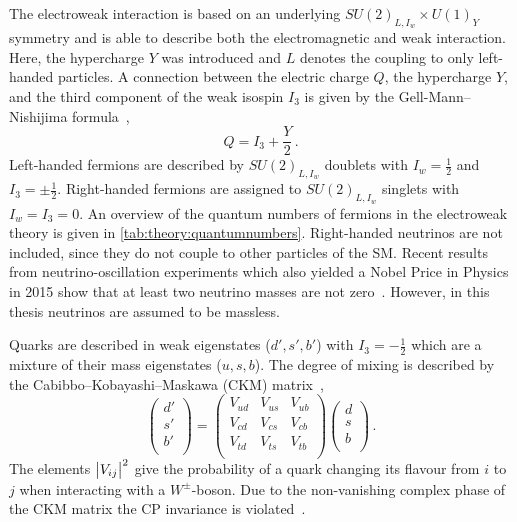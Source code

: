 The electroweak interaction is based on an underlying $SU{(2)}_{L,I_w} \times U{(1)}_Y$ symmetry
and is able to describe both the electromagnetic and weak interaction.
Here, the hypercharge $Y$ was introduced and $L$ denotes the coupling to only left-handed particles.
A connection between the electric charge $Q$, the hypercharge $Y$, and the third component of the weak isospin $I_3$
is given by the Gell-Mann--Nishijima formula~\cite{Nishijima1955,GellMann1956},
\begin{equation}
    Q = I_3 + \frac{Y}{2} \,.
\end{equation}
Left-handed fermions are described by $SU{(2)}_{L,I_w}$ doublets with $I_w = \frac{1}{2}$ and $I_3 = \pm \frac{1}{2}$.
Right-handed fermions are assigned to $SU{(2)}_{L,I_w}$ singlets with $I_w = I_3 = 0$.
An overview of the quantum numbers of fermions in the electroweak theory is given in \cref{tab:theory:quantumnumbers}.
Right-handed neutrinos are not included, since they do not couple to other particles of the SM\@.
Recent results from neutrino-oscillation experiments which also yielded a Nobel Price in Physics in 2015 show that at
least two neutrino masses are not zero~\cite{NeutrinoOsc1,NeutrinoOsc2,NeutrinoOsc3,NeutrinoOsc4,NeutrinoOsc5,NeutrinoOsc6}.
However, in this thesis neutrinos are assumed to be massless.

Quarks are described in weak eigenstates ($d',s',b'$) with $I_3 = -\frac{1}{2}$ which are a mixture of their mass eigenstates ($u, s, b$).
The degree of mixing is described by the Cabibbo--Kobayashi--Maskawa (CKM) matrix~\cite{CKM:KM,CKM:C},
\begin{equation}
    \begin{pmatrix}
        d' \\ s' \\ b' \\
    \end{pmatrix}
    =
    \begin{pmatrix}
        V_{ud} & V_{us} & V_{ub} \\
        V_{cd} & V_{cs} & V_{cb} \\
        V_{td} & V_{ts} & V_{tb} \\
    \end{pmatrix}
    \begin{pmatrix}
        d \\ s \\ b \\
    \end{pmatrix} \,.
\end{equation}
The elements $\left|V_{ij}\right|^2$ give the probability of a quark changing its flavour from $i$ to $j$ when interacting with a $W^\pm$-boson.
Due to the non-vanishing complex phase of the CKM matrix the CP invariance is violated~\cite{PhysRevLett.13.138}.


